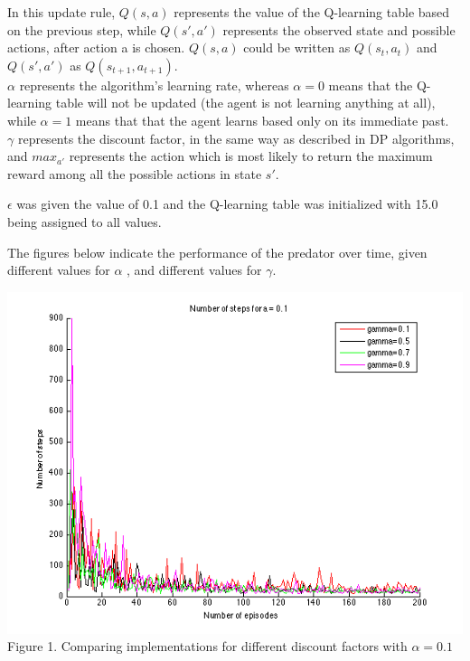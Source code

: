 \documentclass[a4paper,11pt]{article}
\begin{document}
In this update rule, $Q(s,a)$ represents the value of the Q-learning table based on the previous step, while $Q(s',a')$ represents the observed state and possible actions, after action a is chosen. $Q(s,a)$ could be written as $Q(s_t,a_t)$ and $Q(s',a')$ as $Q(s_{t+1}, a_{t+1})$.\\
$\alpha$ represents the algorithm's learning rate, whereas $\alpha =0$ means that the Q-learning table will not be updated (the agent is not learning anything at all), while $\alpha =1$ means that that the agent learns based only on its immediate past.\\
$\gamma$ represents the discount factor, in the same way as described in DP algorithms, and $max_{a'}$ represents the action which is most likely to return the maximum reward among all the possible actions in state $s'$.

$\epsilon$ was given the value of 0.1 and the Q-learning table was initialized with 15.0 being assigned to all values. 


The figures below indicate the performance of the predator over time, given different values for $\alpha$ , and different values for $\gamma$.




\begin{center}
\includegraphics[width=1.0\textwidth,height=0.4\textheight]{a1.png}
\label{Figure 1}
Figure 1. 	Comparing implementations for different discount factors with $\alpha = 0.1$\vspace{1cm}
\end{center}
\end{document}

